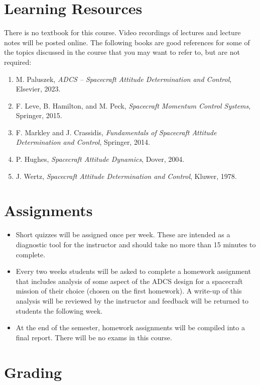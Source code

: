 \documentclass[11pt,letterpaper]{article}
\begin{document}
\section*{Learning Resources}

There is no textbook for this course. Video recordings of lectures and lecture notes will be posted online. The following books are good references for some of the topics discussed in the course that you may want to refer to, but are not required:

\begin{enumerate}
	\item M. Paluszek, \textit{ADCS -- Spacecraft Attitude Determination and Control}, Elsevier, 2023.
	\item F. Leve, B. Hamilton, and M. Peck, \textit{Spacecraft Momentum Control Systems}, Springer, 2015.
	\item F. Markley and J. Crassidis, \textit{Fundamentals of Spacecraft Attitude Determination and Control}, Springer, 2014.
	\item P. Hughes, \textit{Spacecraft Attitude Dynamics}, Dover, 2004.
	\item J. Wertz, \textit{Spacecraft Attitude Determination and Control}, Kluwer, 1978.
\end{enumerate}
\section*{Assignments}

\begin{itemize}
	\item Short quizzes will be assigned once per week. These are intended as a diagnostic tool for the instructor and should take no more than 15 minutes to complete.
	\item Every two weeks students will be asked to complete a homework assignment that includes analysis of some aspect of the ADCS design for a spacecraft mission of their choice (chosen on the first homework). A write-up of this analysis will be reviewed by the instructor and feedback will be returned to students the following week.
	\item At the end of the semester, homework assignments will be compiled into a final report. There will be no exams in this course.
\end{itemize}

\section*{Grading}
\end{document}
